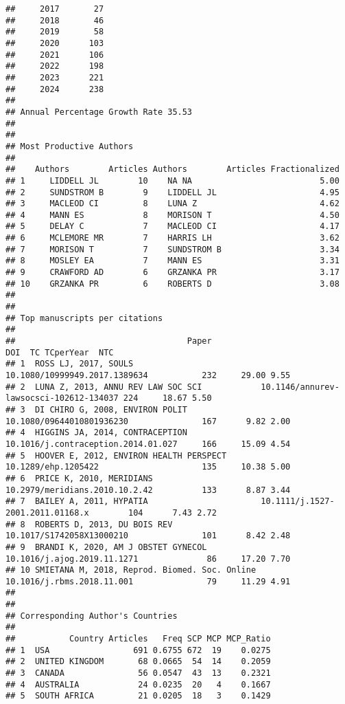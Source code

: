 \documentclass[
]{article}
\begin{document}
\begin{verbatim}
##     2017       27
##     2018       46
##     2019       58
##     2020      103
##     2021      106
##     2022      198
##     2023      221
##     2024      238
## 
## Annual Percentage Growth Rate 35.53 
## 
## 
## Most Productive Authors
## 
##    Authors        Articles Authors        Articles Fractionalized
## 1     LIDDELL JL        10    NA NA                          5.00
## 2     SUNDSTROM B        9    LIDDELL JL                     4.95
## 3     MACLEOD CI         8    LUNA Z                         4.62
## 4     MANN ES            8    MORISON T                      4.50
## 5     DELAY C            7    MACLEOD CI                     4.17
## 6     MCLEMORE MR        7    HARRIS LH                      3.62
## 7     MORISON T          7    SUNDSTROM B                    3.34
## 8     MOSLEY EA          7    MANN ES                        3.31
## 9     CRAWFORD AD        6    GRZANKA PR                     3.17
## 10    GRZANKA PR         6    ROBERTS D                      3.08
## 
## 
## Top manuscripts per citations
## 
##                                   Paper                                              DOI  TC TCperYear  NTC
## 1  ROSS LJ, 2017, SOULS                          10.1080/10999949.2017.1389634           232     29.00 9.55
## 2  LUNA Z, 2013, ANNU REV LAW SOC SCI            10.1146/annurev-lawsocsci-102612-134037 224     18.67 5.50
## 3  DI CHIRO G, 2008, ENVIRON POLIT               10.1080/09644010801936230               167      9.82 2.00
## 4  HIGGINS JA, 2014, CONTRACEPTION               10.1016/j.contraception.2014.01.027     166     15.09 4.54
## 5  HOOVER E, 2012, ENVIRON HEALTH PERSPECT       10.1289/ehp.1205422                     135     10.38 5.00
## 6  PRICE K, 2010, MERIDIANS                      10.2979/meridians.2010.10.2.42          133      8.87 3.44
## 7  BAILEY A, 2011, HYPATIA                       10.1111/j.1527-2001.2011.01168.x        104      7.43 2.72
## 8  ROBERTS D, 2013, DU BOIS REV                  10.1017/S1742058X13000210               101      8.42 2.48
## 9  BRANDI K, 2020, AM J OBSTET GYNECOL           10.1016/j.ajog.2019.11.1271              86     17.20 7.70
## 10 SMIETANA M, 2018, Reprod. Biomed. Soc. Online 10.1016/j.rbms.2018.11.001               79     11.29 4.91
## 
## 
## Corresponding Author's Countries
## 
##           Country Articles   Freq SCP MCP MCP_Ratio
## 1  USA                 691 0.6755 672  19    0.0275
## 2  UNITED KINGDOM       68 0.0665  54  14    0.2059
## 3  CANADA               56 0.0547  43  13    0.2321
## 4  AUSTRALIA            24 0.0235  20   4    0.1667
## 5  SOUTH AFRICA         21 0.0205  18   3    0.1429

\end{verbatim}
\end{document}
